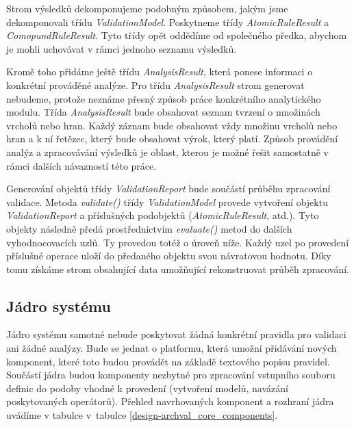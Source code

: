 Strom výsledků dekomponujeme podobným způsobem, jakým jsme dekomponovali třídu \emph{ValidationModel}. Poskytneme třídy \emph{AtomicRuleResult} a \emph{ComopundRuleResult}. Tyto třídy opět oddědíme od společného předka, abychom je mohli uchovávat v rámci jednoho seznamu výsledků.

Kromě toho přidáme ještě třídu \emph{AnalysisResult}, která ponese informaci o konkrétní prováděné analýze. Pro třídu \emph{AnalysisResult} strom generovat nebudeme, protože neznáme přesný způsob práce konkrétního analytického modulu. Třída \emph{AnalysisResult} bude obsahovat seznam tvrzení o množinách vrcholů nebo hran. Každý záznam bude obsahovat vždy množinu vrcholů nebo hran a k ní řetězec, který bude obsahovat výrok, který platí. Způsob provádění analýz a zpracovávání výsledků je oblast, kterou je možné řešit samostatně v rámci dalších návazností této práce.

Generování objektů třídy \emph{ValidationReport} bude součástí průběhu zpracování validace. Metoda \emph{validate()} třídy \emph{ValidationModel} provede vytvoření objektu \emph{ValidationReport} a příslušných podobjektů (\emph{AtomicRuleResult}, atd.). Tyto objekty následně předá prostřednictvím \emph{evaluate()} metod do dalších vyhodnocovacích uzlů. Ty provedou totéž o úroveň níže. Každý uzel po provedení příslušné operace uloží do předaného objektu svou návratovou hodnotu. Díky tomu získáme strom obsahující data umožňující rekonstruovat průběh zpracování.



\subsection{Jádro systému}
Jádro systému samotné nebude poskytovat žádná konkrétní pravidla pro validaci ani žádné analýzy. Bude se jednat o platformu, která umožní přidávání nových komponent, které toto budou provádět na základě textového popisu pravidel. Součástí jádra budou komponenty nezbytné pro zpracování vstupního souboru definic do podoby vhodné k provedení (vytvoření modelů, navázání poskytovaných operátorů). Přehled navrhovaných komponent a rozhraní jádra uvádíme v tabulce v~tabulce \ref{design-archval_core_components}.

